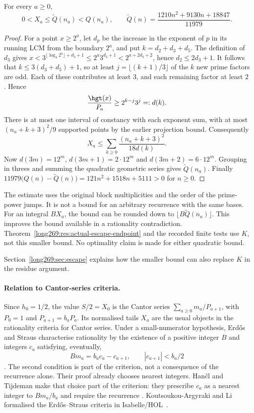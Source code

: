 \begin{proposition}
\label{long269:res:jump-constrained-bound}
For every $a\ge0$,
\[
 0<X_a\le\widetilde Q(n_a)<Q(n_a),\qquad
 \widetilde Q(n)=\frac{1210n^2+9130n+18847}{11979}.
\]
\end{proposition}
\begin{proof}
For a point $x\ge2^a$, let $d_p$ be the increase in the exponent of $p$ in its running LCM
from the boundary $2^a$, and put $k=d_2+d_3+d_5$.
The definition of $d_3$ gives
$x<3^{\lfloor\log_3 2^a\rfloor+d_3+1}\le2^a3^{d_3+1}
<2^{a+2d_3+2}$, hence $d_2\le2d_3+1$.
It follows that $k\le3(d_3+d_5)+1$, so at least
$j=\lfloor(k+1)/3\rfloor$ of the $k$ new prime factors are odd.
Each of these contributes at least $3$, and each remaining factor at
least $2$.  Hence
\[
 \frac{\hgt(x)}{P_a}\ge2^{k-j}3^j=:d(k).
\]
There is at most one interval of constancy with each exponent sum, with at most
$(n_a+k+3)^2/9$ supported points by the earlier projection bound.
Consequently
\[
 X_a\le\sum_{k\ge0}\frac{(n_a+k+3)^2}{18d(k)}.
\]
Now $d(3m)=12^m$, $d(3m+1)=2\cdot12^m$ and
$d(3m+2)=6\cdot12^m$.  Grouping in threes and summing the quadratic
geometric series gives $\widetilde Q(n_a)$.
Finally $11979\bigl(Q(n)-\widetilde Q(n)\bigr)
=121n^2+1518n+5111>0$ for $n\ge0$.
\end{proof}
The estimate uses the original block multiplicities and the order of
the prime-power jumps.  It is not a bound for an arbitrary recurrence
with the same bases.  For an integral $BX_a$, the bound can be
rounded down to $\lfloor B\widetilde Q(n_a)\rfloor$.  This improves the
bound available in a rationality contradiction.
Theorem~\ref{long269:res:actual-escape-endpoint} and the recorded finite
tests use $K$, not this smaller bound.  No optimality claim is made for
either quadratic bound.

Section~\ref{long269:sec:escape} explains how the smaller bound can also
replace $K$ in the residue argument.

\paragraph{Relation to Cantor-series criteria.}
Since $h_0=1/2$, the value $S/2=X_0$ is the Cantor series
$\sum_{a\ge0}m_a/P_{a+1}$, with $P_0=1$ and $P_{a+1}=b_aP_a$.
Its normalised tails $X_a$ are the usual objects in the rationality
criteria for Cantor series.  Under a small-numerator hypothesis,
Erd\H{o}s and Straus characterise rationality by the existence of a
positive integer $B$ and integers $c_a$ satisfying, eventually,
\[
 Bm_a=b_ac_a-c_{a+1},\qquad |c_{a+1}|<b_a/2
\]
\cite[Theorem~2.1 and (2.4), pp.~85--86]{erdosstraus1974}.
The second condition is part of the criterion, not a consequence of the
recurrence alone.  Their proof already chooses nearest integers.
Han\v{c}l and Tijdeman make that choice part of the criterion: they
prescribe $c_a$ as a nearest integer to $Bm_a/b_a$ and require the recurrence
\cite[\S\S2--3 and Theorem~3.1, pp.~372--375]{hancltijdeman2004}.
Koutsoukou-Argyraki and Li formalised the Erd\H{o}s--Straus criteria in
Isabelle/HOL~\cite{afperdosstraus2020}.


